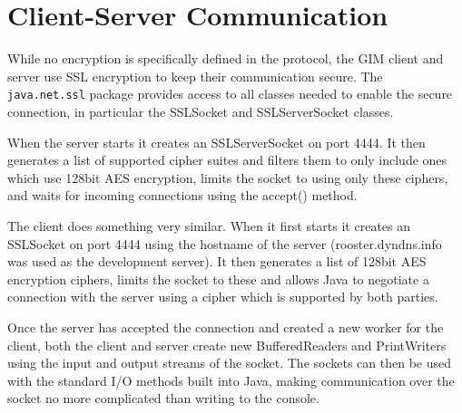 \section{Client-Server Communication}
\label{comm}

While no encryption is specifically defined in the protocol, the GIM client and server use SSL encryption to keep their communication secure. The \texttt{java.net.ssl} package provides access to all classes needed to enable the secure connection, in particular the SSLSocket and SSLServerSocket classes.

When the server starts it creates an SSLServerSocket on port 4444. It then generates a list of supported cipher suites and filters them to only include ones which use 128bit AES encryption, limits the socket to using only these ciphers, and waits for incoming connections using the accept() method.

The client does something very similar. When it first starts it creates an SSLSocket on port 4444 using the hostname of the server (rooster.dyndns.info was used as the development server). It then generates a list of 128bit AES encryption ciphers, limits the socket to these and allows Java to negotiate a connection with the server using a cipher which is supported by both parties.

Once the server has accepted the connection and created a new worker for the client, both the client and server create new BufferedReaders and PrintWriters using the input and output streams of the socket. The sockets can then be used with the standard I/O methods built into Java, making communication over the socket no more complicated than writing to the console.
